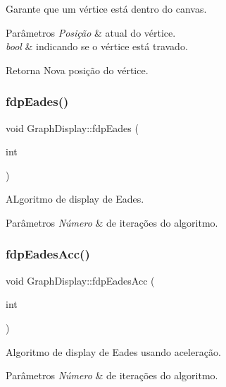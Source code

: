 Garante que um vértice está dentro do canvas. 
\begin{DoxyParams}{Parâmetros}
{\em Posição} & atual do vértice. \\
\hline
{\em bool} & indicando se o vértice está travado. \\
\hline
\end{DoxyParams}
\begin{DoxyReturn}{Retorna}
Nova posição do vértice. 
\end{DoxyReturn}
\mbox{\label{classGraphDisplay_af709c8e4e8c0e270dbe5edcab2c8e350}} 
\subsubsection{\texorpdfstring{fdpEades()}{fdpEades()}}
{\footnotesize\ttfamily void Graph\+Display\+::fdp\+Eades (\begin{DoxyParamCaption}\item[{int}]{ }\end{DoxyParamCaption})}

A\+Lgoritmo de display de Eades. 
\begin{DoxyParams}{Parâmetros}
{\em Número} & de iterações do algoritmo. \\
\hline
\end{DoxyParams}
\mbox{\label{classGraphDisplay_a982c8bb3e300720840a6e1fbd877f5ba}} 
\subsubsection{\texorpdfstring{fdpEadesAcc()}{fdpEadesAcc()}}
{\footnotesize\ttfamily void Graph\+Display\+::fdp\+Eades\+Acc (\begin{DoxyParamCaption}\item[{int}]{ }\end{DoxyParamCaption})}

Algoritmo de display de Eades usando aceleração. 
\begin{DoxyParams}{Parâmetros}
{\em Número} & de iterações do algoritmo. \\
\hline
\end{DoxyParams}
\mbox{\label{classGraphDisplay_aaf2ed129c6647b38b0170133ae4f0823}} 
